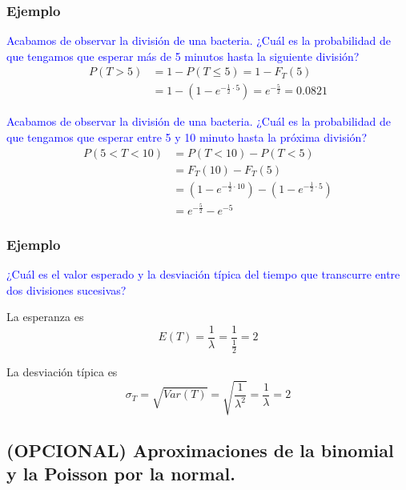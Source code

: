 \documentclass[handout]{beamer}\usepackage[]{graphicx}\usepackage[]{color}
\newcommand{\blue}[1]{\textcolor{blue}{#1}}
\renewcommand{\leq}{\leqslant}
\theoremstyle{plain}
\theoremstyle{definition}
\begin{document}
\begin{frame}
\frametitle{Ejemplo}

\blue{Acabamos de observar la  división de una bacteria. ¿Cuál  es la probabilidad de que tengamos que esperar más de 5 minutos  hasta la siguiente división?}
\pause
$$
\begin{array}{rl}
P(T>5) & =1-P(T\leq 5)=1-F_T(5)\\ & =1-(1-e^{-\frac{1}{2}\cdot 5}) =
e^{-\frac{5}{2}}=0.0821
\end{array}
$$
\pause

\blue{Acabamos de observar la  división de una bacteria. ¿Cuál  es la probabilidad de que tengamos que  esperar entre 5 y 10  minuto hasta la próxima división?}
\pause
$$
\begin{array}{rl}
P(5<T<10)  & =P(T<10)-P(T<5)\\ &=F_T(10)-F_T(5)\\ & =(1-e^{-\frac{1}{2}\cdot 10})-(1-e^{-\frac{1}{2}\cdot 5})\\ & =e^{-\frac{5}{2}}-e^{-5}
\end{array}
$$



\end{frame}



\begin{frame}
\frametitle{Ejemplo}

\blue{¿Cuál es el valor esperado y  la desviación típica  del tiempo que transcurre entre dos divisiones sucesivas?}
\medskip

La esperanza es
$$
E(T)=\frac{1}{\lambda}=\frac{1}{\frac{1}{2}}=2
$$

La desviación típica es
$$
\sigma_T=\sqrt{Var(T)}=\sqrt{\frac{1}{\lambda^2}}=\frac{1}{\lambda}=2
$$


\end{frame}



 
\subsection{(OPCIONAL) Aproximaciones de la binomial y la Poisson por la normal.}
 
\end{document}
